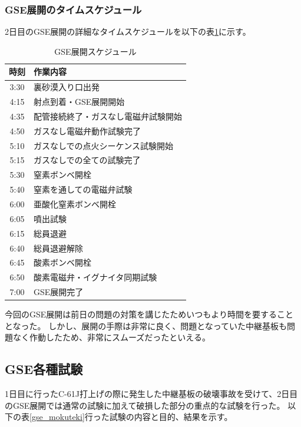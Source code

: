 \documentclass[a4paper,11pt,uplatex]{jsarticle}
\begin{document}
\subsubsection{GSE展開のタイムスケジュール}
2日目のGSE展開の詳細なタイムスケジュールを以下の表\ref{gse_time}に示す。
\begin{table}[H]
	\centering
	\caption{GSE展開スケジュール}
	\begin{tabular}{cl} \toprule
		時刻   & 作業内容               \\ \midrule
		3:30 & 裏砂漠入り口出発           \\
		4:15 & 射点到着・GSE展開開始       \\
		4:35 & 配管接続終了・ガスなし電磁弁試験開始 \\
		4:50 & ガスなし電磁弁動作試験完了      \\
		5:10 & ガスなしでの点火シーケンス試験開始  \\
		5:15 & ガスなしでの全ての試験完了      \\
		5:30 & 窒素ボンベ開栓            \\
		5:40 & 窒素を通しての電磁弁試験       \\
		6:00 & 亜酸化窒素ボンベ開栓         \\
		6:05 & 噴出試験               \\
		6:15 & 総員退避               \\
		6:40 & 総員退避解除             \\
		6:45 & 酸素ボンベ開栓            \\
		6:50 & 酸素電磁弁・イグナイタ同期試験    \\
		7:00 & GSE展開完了            \\
		\bottomrule
	\end{tabular}
	\label{gse_time}
\end{table}

今回のGSE展開は前日の問題の対策を講じたためいつもより時間を要することとなった。
しかし、展開の手際は非常に良く、問題となっていた中継基板も問題なく作動したため、非常にスムーズだったといえる。

\subsection{GSE各種試験}
1日目に行ったC-61J打上げの際に発生した中継基板の破壊事故を受けて、2日目のGSE展開では通常の試験に加えて破損した部分の重点的な試験を行った。
以下の表\ref{gse_mokuteki}行った試験の内容と目的、結果を示す。
\end{document}
